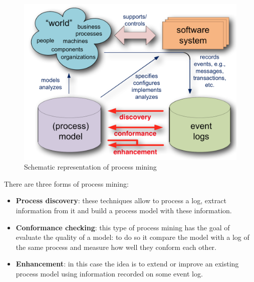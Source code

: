 \begin{figure}[!ht]
    \centering
\includegraphics[width=\textwidth]{images/pm_resume.png}
    \caption{Schematic representation of process mining \cite{DBLP:conf/bpm/ProcessMiningManifesto}}
    \label{images:pm_resume}
\end{figure}

There are three forms of process mining:

\begin{itemize}

    \item \textbf{Process discovery}: these techniques allow to process a log, extract information from it and build a 
        process model with these information.

    \item \textbf{Conformance checking}: this type of process mining has the goal of evaluate the quality of a model: to 
        do so it compare the model with a log of the same process and measure how well they conform each other.

    \item \textbf{Enhancement}: in this case the idea is to extend or improve an existing process model using information 
        recorded on some event log.
    
\end{itemize}

